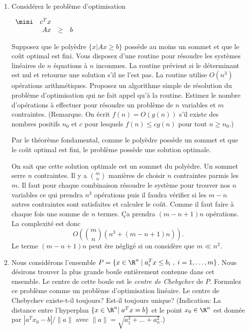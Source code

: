 \begin{enumerate}
  \item     Considérez le problème d'optimisation

    $
    \begin{array}{lrcr}
      \mini & c^T x \\
      & Ax & \geq & b
    \end{array}
    $

    Supposez que le poly\`edre $\{x |  Ax \geq b \}$  possède au moins un sommet et que le coût optimal est fini. Vous disposez d'une routine pour résoudre les
    systèmes linéaires de $n$ équations à $n$ inconnues. La routine prévient si le déterminant est nul et retourne une solution s'il ne l'est pas. La routine
    utilise
    $O(n^3)$ opérations arithmétiques.  Proposez un algorithme
    simple de résolution du problème d'optimisation qui ne fait appel qu'à la routine. Estimez le nombre d'opérations à effectuer pour résoudre un
    problème de
    $n$ variables et $m$ contraintes. (Remarque. On écrit $f(n)=O(g(n))$ s'il existe des nombres positifs $n_0$ et $c$ pour lesquels $f(n) \leq cg(n)$ pour tout
    $n \geq n_0$.)


    \begin{solution}
      Par le théorème fondamental, comme le polyèdre possède un sommet
      et que le coût optimal est fini, le problème possède
      une solution optimale.

      On sait que cette solution optimale est un sommet du polyèdre.
      Un sommet serre $n$ contraintes. Il y a ${m \choose n}$
      manières de choisir $n$ contraintes parmis les $m$.
      Il faut pour chaque combinaison résoudre le système pour trouver
      nos $n$ variables ce qui prendra $n^3$ opérations puis il faudra
      vérifier si les $m-n$ autres contraintes sont satisfaites et
      calculer le coût.
      Comme il faut faire à chaque fois une somme de $n$ termes.
      Ça prendra $(m-n+1)n$ opérations.
      La complexité est donc
      \[ O\left({m \choose n}(n^3 + (m-n+1)n)\right). \]
      Le terme $(m-n+1)n$ peut êre négligé si on considère que $m \ll n^2$.
    \end{solution}

  \item Nous considérons l'ensemble $P=\{ x \in \R^n \; | \; a_i^T x \leq b_i \; , \;  i=1, \ldots, m \}$. Nous désirons trouver la
    plus grande boule entièrement contenue dans cet ensemble. Le centre de cette boule est  le {\it centre de Chebychev} de $P$.  Formulez
    ce problème comme un problème d'optimisation linéaire. Le centre de Chebychev
    existe-t-il toujours? Est-il toujours unique? (Indication:  La distance entre l'hyperplan $\{x \in \R^n | \;  a^Tx=b \}$ et le point $x_0 \in \R^n$
    est donnée par
    $|a^Tx_0 - b|/\|a\|$ avec $\|a\|=\sqrt{a_1^2+ \ldots + a_n^2}$.)




\end{enumerate}

